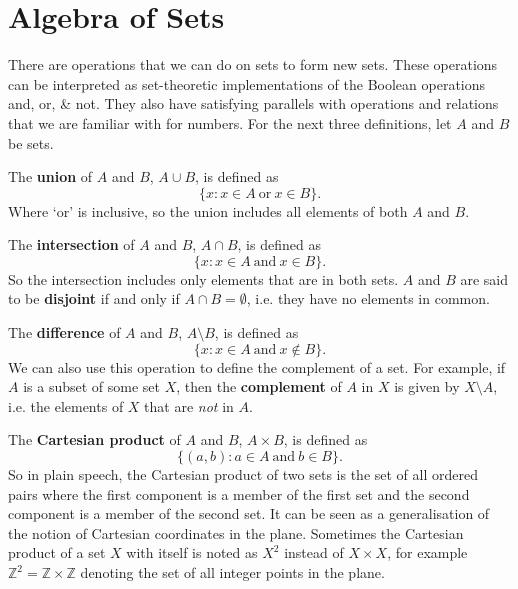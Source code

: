 \documentclass[../real_analysis.tex]{subfiles}
\begin{document}
    \section{Algebra of Sets}
        There are operations that we can do on sets to form new sets. These operations can be interpreted as set-theoretic implementations of the Boolean operations and, or, \& not. They also have satisfying parallels with operations and relations that we are familiar with for numbers. For the next three definitions, let $A$ and $B$ be sets.
        \begin{definition}
            The \textbf{union} of $A$ and $B$, $A \cup B$, is defined as
            \[\{x: x \in A\ \text{or}\ x \in B\}.\]
            Where `or' is inclusive, so the union includes all elements of both $A$ and $B$.
        \end{definition}
        \begin{definition}
            The \textbf{intersection} of $A$ and $B$, $A \cap B$, is defined as
            \[\{x: x \in A\ \text{and}\ x \in B\}.\]
            So the intersection includes only elements that are in both sets. $A$ and $B$ are said to be \textbf{disjoint} if and only if $A \cap B = \emptyset$, i.e. they have no elements in common.
        \end{definition}
        \begin{definition}
            The \textbf{difference} of $A$ and $B$, $A \setminus B$, is defined as
            \[\{x: x \in A\ \text{and}\ x \notin B\}.\]
            We can also use this operation to define the complement of a set. For example, if $A$ is a subset of some set $X$, then the \textbf{complement} of $A$ in $X$ is given by $X \setminus A$, i.e. the elements of $X$ that are \textit{not} in $A$.
        \end{definition}
        \begin{definition}
            The \textbf{Cartesian product} of $A$ and $B$, $A\times B$, is defined as
            \[\{(a, b): a \in A\ \text{and}\ b \in B\}.\]
            So in plain speech, the Cartesian product of two sets is the set of all ordered pairs where the first component is a member of the first set and the second component is a member of the second set. It can be seen as a generalisation of the notion of Cartesian coordinates in the plane. Sometimes the Cartesian product of a set $X$ with itself is noted as $X^2$ instead of $X \times X$, for example $\mathbb{Z}^2 = \mathbb{Z} \times \mathbb{Z}$ denoting the set of all integer points in the plane.
        \end{definition}
\end{document}
